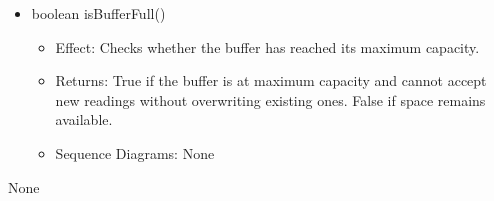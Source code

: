 \begin{description}
\begin{itemize}[noitemsep,nolistsep,leftmargin=-.25cm]
        \begin{itemize}[noitemsep,nolistsep]
           \item Effect: Returns all sensor data packages currently held in the buffer awaiting transmission. Called by SensorDataTransmitter to retrieve readings for delivery to the CommunicationGateway. 
           \item Returns: An ordered list of tuples each containing a \ref{data:DatatypesSensorDataPackage} and the timestamp at which it was acquired. Ordered from oldest to newest so that SensorDataTransmitter delivers data in chronological order.
           \item Sequence Diagrams: None
        \end{itemize}
      \item \textsf{boolean isBufferFull()}
        \begin{itemize}[noitemsep,nolistsep]
           \item Effect: Checks whether the buffer has reached its maximum capacity.
 
           \item Returns: True if the buffer is at maximum capacity and cannot accept new readings without overwriting existing ones. False if space remains available.
           \item Sequence Diagrams: None
        \end{itemize}
    \end{itemize}
      \item[Diagrams:] None
    \end{description}

